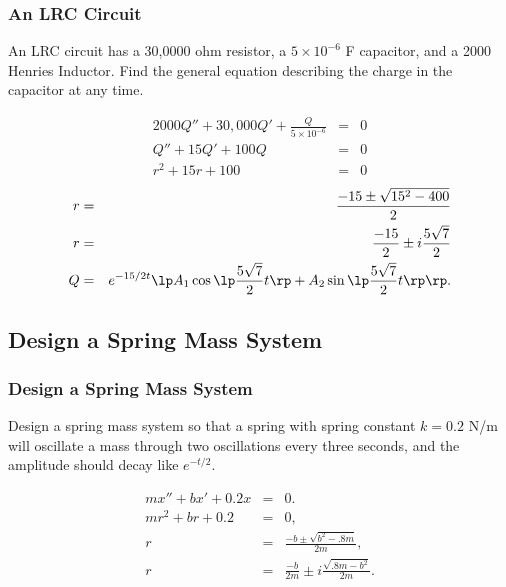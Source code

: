 \begin{frame}
  \frametitle{An LRC Circuit}

  An LRC circuit has a 30,0000 ohm resistor, a $5\times 10^{-6}$ F
  capacitor, and a 2000 Henries Inductor. Find the general equation
  describing  the charge in the capacitor at any time.

  {
    \begin{eqnarray*}
      2000 Q'' + 30,000 Q' + \frac{Q}{5\times 10^{-6}} & = & 0 \\
      Q'' + 15 Q' + 100 Q & = & 0 \\
      r^2 + 15 r + 100 & = & 0 
    \end{eqnarray*}
    \begin{eqnarray*}
      r & = & \frac{-15\pm\sqrt{15^2-400}}{2} \\
      r & = & \frac{-15}{2} \pm i\frac{5\sqrt{7}}{2} \\
      Q & = & e^{-15/2 t} 
      \lp A_1 \cos\lp \frac{5\sqrt{7}}{2} t\rp + A_2 \sin\lp \frac{5\sqrt{7}}{2} t \rp \rp.
    \end{eqnarray*}
    
  }

\end{frame}

\subsection{Design a Spring Mass System}

\begin{frame}
  \frametitle{Design a Spring Mass System}

  Design a spring mass system so that a spring with spring constant
  $k=0.2$ N/m will oscillate a mass through two oscillations every
  three seconds, and the amplitude should decay like $e^{-t/2}$.

  {
    \begin{eqnarray*}
      m x'' + bx' + 0.2x & = & 0. \\
      m r^2 + br + 0.2 & = & 0, \\
      r & = & \frac{-b\pm\sqrt{b^2-.8m}}{2m}, \\
      r & = & \frac{-b}{2m} \pm i \frac{\sqrt{.8m - b^2}}{2m}.
    \end{eqnarray*}
    
  }

\end{frame}


